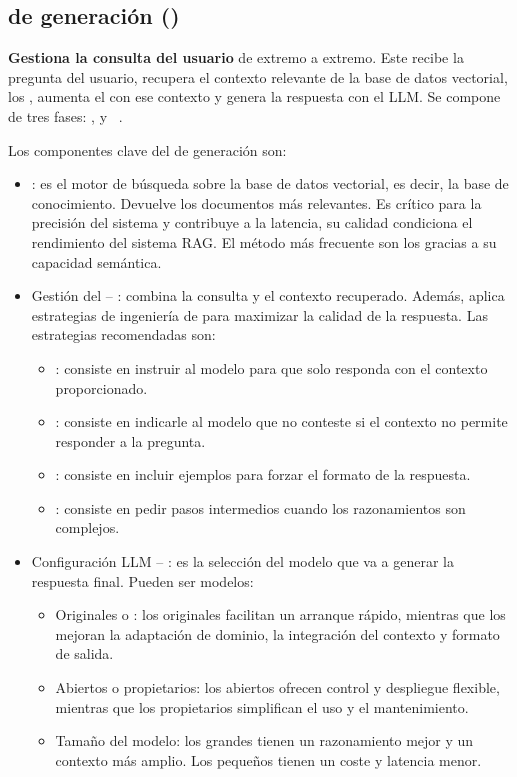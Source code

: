 \subsection{ de generación ()}
\textbf{Gestiona la consulta del usuario} de extremo a extremo. Este  recibe la pregunta del usuario, recupera el contexto relevante de la base de datos vectorial, los , aumenta el  con ese contexto y genera la respuesta con el LLM. Se compone de tres fases: ,  y ~\cite{book:RAG_SimpleGuide}. 

Los componentes clave del  de generación son:
\begin{itemize}
\tightlist
	\item \textbf{}: es el motor de búsqueda sobre la base de datos vectorial, es decir, la base de conocimiento. Devuelve los documentos más relevantes. Es crítico para la precisión del sistema y contribuye a la latencia, su calidad condiciona el rendimiento del sistema RAG. El método más frecuente son los  gracias a su capacidad semántica.
	\item Gestión del  -- \textbf{}: combina la consulta y el contexto recuperado. Además, aplica estrategias de ingeniería de  para maximizar la calidad de la respuesta. Las estrategias recomendadas son:
	\begin{itemize}
	\tightlist
		\item {}: consiste en instruir al modelo para que solo responda con el contexto proporcionado.
		\item {}: consiste en indicarle al modelo que no conteste si el contexto no permite responder a la pregunta.
		\item {}: consiste en incluir ejemplos para forzar el formato de la respuesta.
		\item {}: consiste en pedir pasos intermedios cuando los razonamientos son complejos.
	\end{itemize}
	\item Configuración LLM -- \textbf{}: es la selección del modelo que va a generar la respuesta final. Pueden ser modelos:
	\begin{itemize}
	\tightlist
		\item Originales o : los originales facilitan un arranque rápido, mientras que los  mejoran la adaptación de dominio, la integración del contexto y formato de salida.
		\item Abiertos o propietarios: los abiertos ofrecen control y despliegue flexible, mientras que los propietarios simplifican el uso y el mantenimiento.
		\item Tamaño del modelo: los grandes tienen un razonamiento mejor y un contexto más amplio. Los pequeños tienen un coste y latencia menor.
	\end{itemize}
\end{itemize} 


